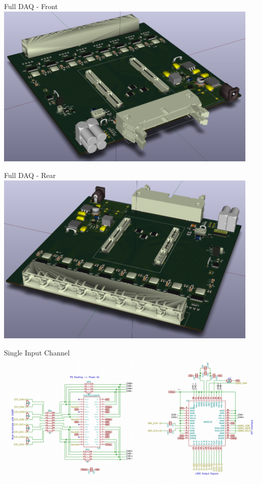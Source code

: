 \documentclass{beamer}
\begin{document}
\begin{frame}{Full DAQ - Front}
  \centering
  \includegraphics[width=0.95\textwidth]{figures/DAQCard2015_Full_Front_small}
\end{frame}

\begin{frame}{Full DAQ - Rear}
  \centering
  \includegraphics[width=0.95\textwidth]{figures/DAQCard2015_Full_Back_small}
\end{frame}

\begin{frame}{Single Input Channel}
  \centering
  \includegraphics[width=\textwidth]{figures/Single_Channel_Schem}
\end{frame}
\end{document}
